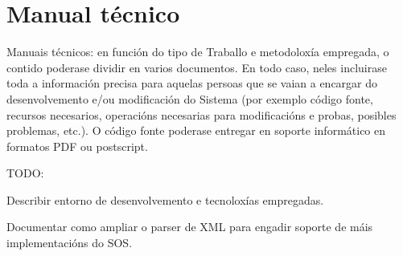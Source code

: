 \chapter{Manual técnico}
Manuais técnicos: en función do tipo de Traballo e metodoloxía empregada, o contido poderase dividir en varios documentos. En todo caso, neles incluirase toda a información precisa para aquelas persoas que se vaian a encargar do desenvolvemento e/ou modificación do Sistema (por exemplo código fonte, recursos necesarios, operacións necesarias para modificacións e probas, posibles problemas, etc.). O código fonte poderase entregar en soporte informático en formatos PDF ou postscript.

TODO:

Describir entorno de desenvolvemento e tecnoloxías empregadas.

Documentar como ampliar o parser de XML para engadir soporte de máis implementacións do SOS.
